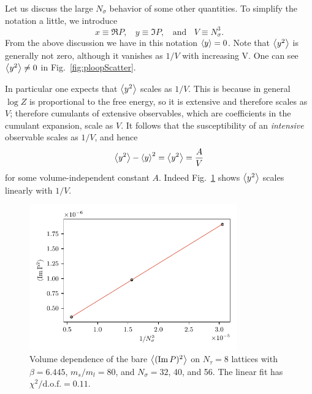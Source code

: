 Let us discuss the large $N_\sigma$ behavior of some other quantities.
To simplify the notation a little, we introduce
\begin{equation}
x\equiv \Re P,~~~~y\equiv \Im P,~~~~\text{and}~~~~V\equiv N_\sigma^3.
\end{equation}
From the above discussion we have in this notation $\ev{y}=0$.
Note that $\ev{y^2}$ is generally not zero,
although it vanishes as $1/V$ with increasing V.
One can see $\ev{y^2}\neq0$ in Fig.~\ref{fig:ploopScatter}.

In particular one expects that $\ev{y^2}$ scales as
$1/V$. This is because in general $\log Z$ is proportional
to the free energy, so it is extensive and therefore scales as $V$;
therefore cumulants of extensive observables, which are coefficients in
the cumulant expansion, scale as $V$. It follows that the
susceptibility of an {\it intensive} observable scales as $1/V$,
and hence
\begin{equation}\label{eq:fssim}
  \ev{y^2}-\ev{y}^2 =\ev{y^2}=\frac{A}{V}
\end{equation}
for some volume-independent constant $A$. Indeed Fig.~\ref{fig:ImPvol} shows 
$\ev{y^2}$ scales linearly with $1/V$.

\begin{figure}
  \centering
  \includegraphics[width=0.8\textwidth]{figs/ImP2_voldepend.pdf}
  \caption{Volume dependence of the bare $\ev{(\Im P)^2}$ on $N_\tau=8$
           lattices with $\beta=6.445$, $m_s/m_l=80$, and $N_\sigma=32$, 40,
           and 56. The linear fit has
           $\chi^2/\text{d.o.f.}=0.11$.}
  \label{fig:ImPvol}
\end{figure}

